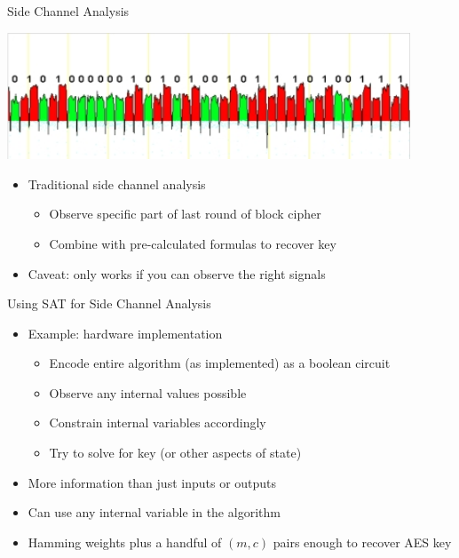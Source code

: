\documentclass[ignorenonframetext,]{beamer}
\providecommand{\tightlist}{%
  \setlength{\itemsep}{0pt}\setlength{\parskip}{0pt}}
\begin{document}
\begin{frame}{Side Channel Analysis}

\begin{center}
\includegraphics[width=0.9\textwidth]{images/sidechannel.jpg}
\end{center}

\begin{itemize}
\tightlist
\item
  Traditional side channel analysis

  \begin{itemize}
  \tightlist
  \item
    Observe specific part of last round of block cipher
  \item
    Combine with pre-calculated formulas to recover key
  \end{itemize}
\item
  Caveat: only works if you can observe the right signals
\end{itemize}

\end{frame}

\begin{frame}{Using SAT for Side Channel Analysis}

\begin{itemize}
\tightlist
\item
  Example: hardware implementation

  \begin{itemize}
  \tightlist
  \item
    Encode entire algorithm (as implemented) as a boolean circuit
  \item
    Observe any internal values possible
  \item
    Constrain internal variables accordingly
  \item
    Try to solve for key (or other aspects of state)
  \end{itemize}
\item
  More information than just inputs or outputs
\item
  Can use \alert{any internal variable} in the algorithm
\item
  Hamming weights plus a handful of \((m, c)\) pairs enough to recover
  AES key \cite{mohamed2012improved-sc}
\end{itemize}

\end{frame}
\end{document}
